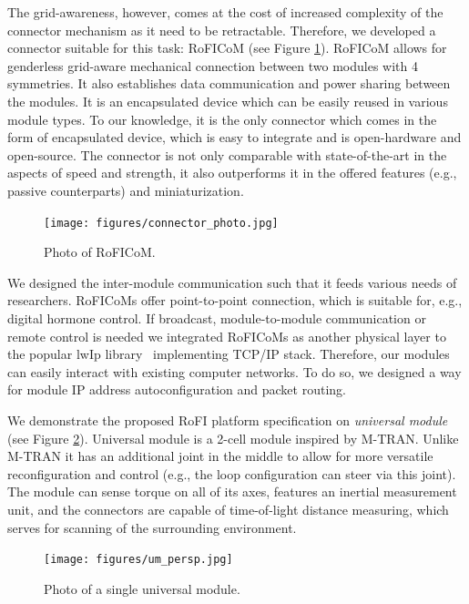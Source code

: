 The grid-awareness, however, comes at the cost of increased complexity of the
connector mechanism as it need to be retractable. Therefore, we developed a
connector suitable for this task: RoFICoM \cite{DBLP:conf/iros/MrazekB19} (see
Figure \ref{fig:roficom}). RoFICoM allows for genderless grid-aware mechanical
connection between two modules with 4 symmetries. It also establishes data
communication and power sharing between the modules. It is an encapsulated
device which can be easily reused in various module types. To our knowledge, it
is the only connector which comes in the form of encapsulated device, which is
easy to integrate and is open-hardware and open-source. The connector is not
only comparable with state-of-the-art in the aspects of speed and strength, it
also outperforms it in the offered features (e.g., passive counterparts) and
miniaturization.

\begin{figure}[t]
    \centering
    \texttt{[image: figures/connector\_photo.jpg]}
    \caption{Photo of RoFICoM.}
    \label{fig:roficom}
\end{figure}

We designed the inter-module communication such that it feeds various needs of
researchers. RoFICoMs offer point-to-point connection, which is suitable for,
e.g., digital hormone control. If broadcast, module-to-module communication or
remote control is needed we integrated RoFICoMs as another physical layer to the
popular lwIp library~\cite{lwip} implementing TCP/IP stack. Therefore, our
modules can easily interact with existing computer networks. To do so, we
designed a way for module IP address autoconfiguration and packet routing.

We demonstrate the proposed RoFI platform specification on \emph{universal
module} (see Figure \ref{fig:umPhoto}). Universal module is a 2-cell module
inspired by M-TRAN. Unlike M-TRAN it has an additional joint in the middle to
allow for more versatile reconfiguration and control (e.g., the loop
configuration can steer via this joint). The module can sense torque on all of
its axes, features an inertial measurement unit, and the connectors are capable
of time-of-light distance measuring, which serves for scanning of the
surrounding environment.

\begin{figure}[t]
    \centering
    \texttt{[image: figures/um\_persp.jpg]}
    \caption{Photo of a single universal module.}
    \label{fig:umPhoto}
\end{figure}

